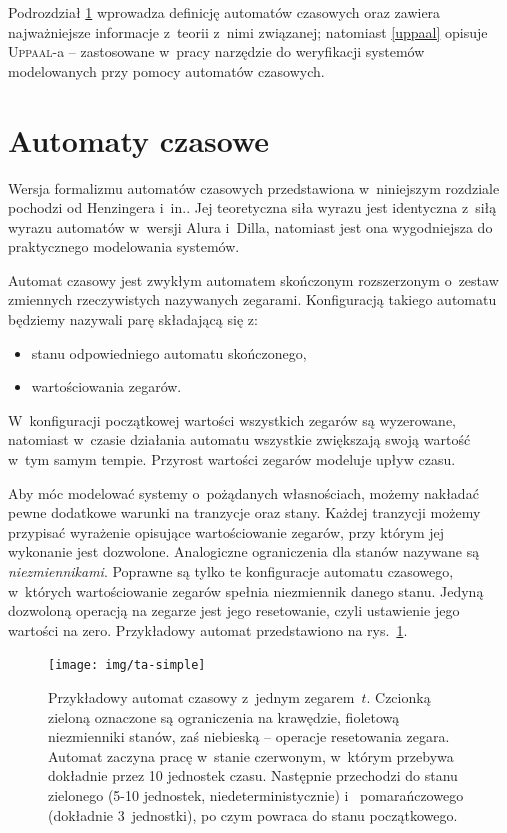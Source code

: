 \documentclass{pracamgr}
\newcommand{\imgr}[1]{rys.~\ref{#1}}
\newcommand{\upp}{\textsc{Uppaal}}
\theoremstyle{plain}
\begin{document}
Podrozdział \ref{ta-theory} wprowadza definicję automatów czasowych
oraz zawiera najważniejsze informacje z~teorii z~nimi związanej;
natomiast \ref{uppaal} opisuje \upp-a -- zastosowane w~pracy narzędzie
do weryfikacji systemów modelowanych przy pomocy automatów czasowych.

\section{Automaty czasowe}
\label{ta-theory}

Wersja formalizmu automatów czasowych przedstawiona w~niniejszym
rozdziale pochodzi od Henzingera i~in.\cite{henz-94}. Jej teoretyczna
siła wyrazu jest identyczna z~siłą wyrazu automatów w~wersji Alura
i~Dilla, natomiast jest ona wygodniejsza do praktycznego modelowania
systemów.

Automat czasowy jest zwykłym automatem skończonym rozszerzonym
o~zestaw zmiennych rzeczywistych nazywanych zegarami. Konfiguracją
takiego automatu będziemy nazywali parę składającą się z:
\begin{itemize}
  \item stanu odpowiedniego automatu skończonego,
  \item wartościowania zegarów.
\end{itemize}
W~konfiguracji początkowej wartości wszystkich zegarów są wyzerowane,
natomiast w~czasie działania automatu wszystkie zwiększają swoją wartość
w~tym samym tempie. Przyrost wartości zegarów modeluje upływ czasu.

Aby móc modelować systemy o~pożądanych własnościach, możemy nakładać
pewne dodatkowe warunki na tranzycje oraz stany. Każdej
tranzycji możemy przypisać wyrażenie opisujące wartościowanie zegarów,
przy którym jej wykonanie jest dozwolone. Analogiczne ograniczenia dla
stanów nazywane są \emph{niezmiennikami}. Poprawne są tylko te
konfiguracje automatu czasowego, w~których wartościowanie zegarów spełnia
niezmiennik danego stanu. Jedyną dozwoloną operacją na zegarze
jest jego resetowanie, czyli ustawienie jego wartości na
zero. Przykładowy automat przedstawiono na \imgr{img:ta-simple}.

\begin{figure}
  \centering
  \texttt{[image: img/ta-simple]}
  \caption {Przykładowy automat czasowy z~jednym zegarem~$t$.
    Czcionką zieloną oznaczone są ograniczenia na krawędzie, fioletową
    niezmienniki stanów, zaś niebieską -- operacje resetowania
    zegara.\\ Automat zaczyna pracę w~stanie czerwonym, w~którym
    przebywa dokładnie przez 10 jednostek czasu. Następnie przechodzi
    do stanu zielonego (5-10 jednostek, niedeterministycznie)
i~    pomarańczowego (dokładnie 3~jednostki), po czym powraca do stanu
    początkowego.}
  \label{img:ta-simple}
\end{figure}
\end{document}
